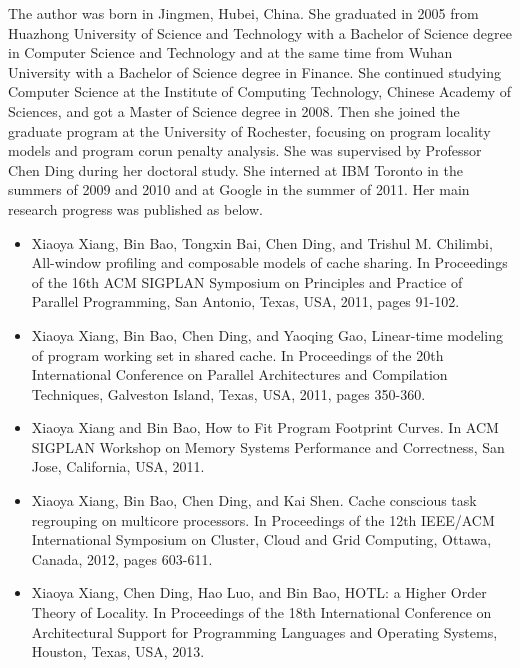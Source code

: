 \documentclass[12pt]{report}
\begin{document}
\begin{curriculumvitae}
The author was born in Jingmen, Hubei, China. She graduated in 2005 from
Huazhong University of Science and Technology with a Bachelor of
Science degree in Computer Science and Technology and at the same time from
Wuhan University with a Bachelor of Science degree in Finance. She
continued studying Computer Science at the Institute of Computing
Technology, Chinese Academy of Sciences, and got a Master of Science
degree in 2008. Then she joined the graduate program at the
University of Rochester, focusing on program locality models and
program corun penalty analysis. She was supervised by Professor Chen
Ding during her doctoral study. She interned at IBM Toronto in the
summers of 2009 and 2010 and at Google in the summer of 2011. Her main
research progress was published as below.

\begin{itemize}
\item Xiaoya Xiang, Bin Bao, Tongxin Bai, Chen Ding, and Trishul
  M. Chilimbi, All-window profiling and composable models of cache sharing.
In Proceedings of the 16th ACM SIGPLAN Symposium on Principles and Practice
of Parallel Programming, San Antonio, Texas, USA, 2011, pages 91-102.
\item Xiaoya Xiang, Bin Bao, Chen Ding, and Yaoqing Gao, Linear-time
  modeling of program working set in shared cache. In Proceedings of
  the 20th International Conference on Parallel Architectures and
  Compilation Techniques, Galveston Island, Texas, USA, 2011, pages 350-360.
\item Xiaoya Xiang and Bin Bao, How to Fit Program Footprint
  Curves. In ACM SIGPLAN Workshop on Memory Systems Performance and
  Correctness, San Jose, California, USA, 2011.
\item Xiaoya Xiang, Bin Bao, Chen Ding, and Kai Shen. Cache conscious
  task regrouping on multicore processors. In Proceedings of the 12th
  IEEE/ACM International Symposium on Cluster, Cloud and Grid
  Computing, Ottawa, Canada, 2012, pages 603-611.
\item Xiaoya Xiang, Chen Ding, Hao Luo, and Bin Bao, HOTL: a Higher
  Order Theory of Locality. In Proceedings of the 18th International
  Conference on Architectural Support for Programming Languages and
  Operating Systems, Houston, Texas, USA, 2013.
\end{itemize}

\end{curriculumvitae}
\end{document}
